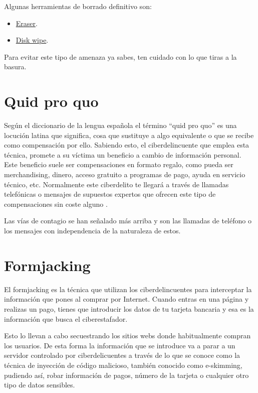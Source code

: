 \documentclass[
  a4paper,
  openany]{book}
\begin{document}
Algunas herramientas de borrado definitivo son:

\begin{itemize}
\item
  \href{https://eraser.heidi.ie/}{Eraser}.
\item
  \href{https://www.diskwipe.org/download.php}{Disk wipe}.
\end{itemize}

Para evitar este tipo de amenaza ya sabes, ten cuidado con lo que tiras a la basura.

\hypertarget{quid-pro-quo}{%
\section{Quid pro quo}\label{quid-pro-quo}}

Según el diccionario de la lengua española el término ``quid pro quo'' es una locución latina que significa, cosa que sustituye a algo equivalente o que se recibe como compensación por ello. Sabiendo esto, el ciberdelincuente que emplea esta técnica, promete a su víctima un beneficio a cambio de información personal. Este beneficio suele ser compensaciones en formato regalo, como pueda ser merchandising, dinero, acceso gratuito a programas de pago, ayuda en servicio técnico, etc. Normalmente este ciberdelito te llegará a través de llamadas telefónicas o mensajes de supuestos expertos que ofrecen este tipo de compensaciones sin coste alguno \citep{quid-pro-quo}.

Las vías de contagio se han señalado más arriba y son las llamadas de teléfono o los mensajes con independencia de la naturaleza de estos.

\hypertarget{formjacking}{%
\section{Formjacking}\label{formjacking}}

El formjacking es la técnica que utilizan los ciberdelincuentes para interceptar la información que pones al comprar por Internet. Cuando entras en una página y realizas un pago, tienes que introducir los datos de tu tarjeta bancaria y esa es la información que busca el ciberestafador.

Esto lo llevan a cabo secuestrando los sitios webs donde habitualmente compran los usuarios. De esta forma la información que se introduce va a parar a un servidor controlado por ciberdelicuentes a través de lo que se conoce como la técnica de inyección de código malicioso, también conocido como e-skimming, pudiendo así, robar información de pagos, número de la tarjeta o cualquier otro tipo de datos sensibles.
\end{document}
